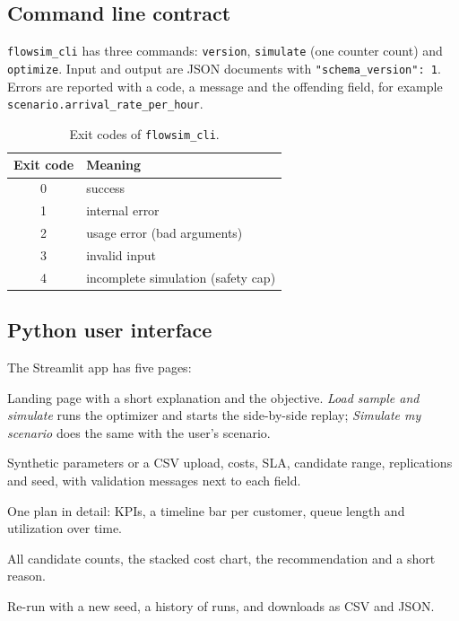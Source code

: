 \documentclass[11pt,a4paper]{article}
\newcommand{\code}[1]{\texttt{#1}}
\begin{document}
\subsection{Command line contract}
\code{flowsim\_cli} has three commands: \code{version}, \code{simulate} (one counter count) and \code{optimize}. Input and
output are JSON documents with \code{"schema\_version": 1}. Errors are reported with a code, a message and the offending
field, for example \code{scenario.arrival\_rate\_per\_hour}.
\begin{table}[H]\centering\small
\begin{tabular}{@{}cl@{}}\toprule Exit code & Meaning\\\midrule
0 & success\\ 1 & internal error\\ 2 & usage error (bad arguments)\\ 3 & invalid input\\ 4 & incomplete simulation (safety cap)\\
\bottomrule\end{tabular}\caption{Exit codes of \code{flowsim\_cli}.}\end{table}

\subsection{Python user interface}
The Streamlit app has five pages:
\begin{description}[style=nextline,leftmargin=1em]
  \item[Live demo] Landing page with a short explanation and the objective. \emph{Load sample and simulate} runs the
    optimizer and starts the side-by-side replay; \emph{Simulate my scenario} does the same with the user's scenario.
  \item[Scenario Builder] Synthetic parameters or a CSV upload, costs, SLA, candidate range, replications and seed, with
    validation messages next to each field.
  \item[Simulation] One plan in detail: KPIs, a timeline bar per customer, queue length and utilization over time.
  \item[Optimize Staffing] All candidate counts, the stacked cost chart, the recommendation and a short reason.
  \item[Experiments \& Export] Re-run with a new seed, a history of runs, and downloads as CSV and JSON.
\end{description}
\end{document}
